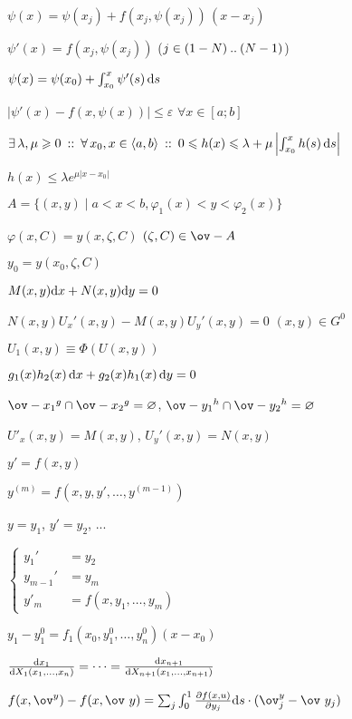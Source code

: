 \documentclass[timbord]{longnotes}
\begin{document}
\begin{list}
\skeq[4]
  \item $\psi (x) = \psi(x_j) + f(x_j, \psi(x_j))\, (x-x_j)$
  \item $\psi'(x) = f(x_j, \psi(x_j))$ 
    \hfill ($j\in (1-N) \mathbin{..} (N-1)$)
  \item $\psi (x) = \psi(x_0) + \int_{x_0}^x \psi'(s) \, \mathrm{d} s$
  \item $|\psi'(x) - f(x,\psi(x))| \leqslant \varepsilon$
    \hfill $\forall x\in [a;b]$
\skeq
  \item $\exists\, \lambda, \mu \geqslant 0 \:::\: 
    \forall\, x_0 , x\in \langle a,b \rangle \:::\: 
    0 \leqslant h(x) \leqslant\lambda+
    \mu \left|\int_{x_0}^x h(s) \,\mathrm{d} s \right|$
  \item $h(x) \leqslant \lambda e^{\mu |x-x_0|}$
\skeq
  \item $A = \{(x,y) \mid a<x<b, \varphi_1(x) <y<\varphi_2(x)\}$
  \item $\varphi(x,C) = y(x,\zeta, C)$
    \hfill $(\zeta,C) \in \ov-{A}$
  \item $y_0 = y(x_0, \zeta, C)$
\nch
  \item $M(x,y)\mathrm{d} x + N(x,y)\mathrm{d} y =0$
    \skeq[7]
  \item $N(x,y)U_x'(x,y) - M(x,y)U_y'(x,y)=0$ \hfill $(x,y) \in G^0$
  \item $U_1(x,y) \equiv \Phi(U(x,y))$
  \item $g_1(x)h_2(x) \, \mathrm{d} x+ g_2(x) h_1(x) \, \mathrm{d} y =0 $
  \item $\ov-{x_1}^g \cap \ov-{x_2}^g = \varnothing$, $\ov-{y_1}^h \cap \ov-{y_2}^h = \varnothing$
\skeq[4]
  \item $U'_x(x,y) = M(x,y)$, $U_y'(x,y) = N(x,y)$
\nch
  \item $y'=f(x,y)$
  \item $y^{(m)} = f(x,y,y', \dotsc, y^{(m-1)})$
  \item $y=y_1$, $y'=y_2$, ...
  \item 
    $ \left\{
    \begin{aligned}
      y_1' &= y_2 \\
      y_{m-1}' &= y_m \\
      y'_m &= f(x,y_1, \dotsc, y_m)
    \end{aligned} \right.
    $
  \item $y_1  - y_1^0 = f_1(x_0,y_1^0, \dotsc, y_n^0)(x-x_0)$
  \item $\fder{x_1}{X_1(x_1, \dotsc, x_n)} =\dotsb=\fder{x_{n+1}}{X_{n+1}(x_1, \dotsc, x_{n+1})}$
  \item $f(x, \ov^y)-f(x,\ov~y) = \sum_j \int_0^1\pder{f(x,u)}{y_j}\del s\cdot(\ov^y_j-\ov~y_j)$

\end{list}
\end{document}
